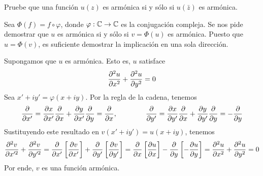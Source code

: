 \begin{exercise}
Pruebe que una función $u(z)$ es armónica si y sólo si $u(\bar z)$ es armónica.
\end{exercise}

\begin{solution}
Sea $\Phi(f) = f \circ \varphi$, donde $\varphi : \C \to \C$ es la conjugación compleja. Se nos pide demostrar que $u$ es armónica si y sólo si $v = \Phi(u)$ es armónica. Puesto que $u = \Phi(v)$, es suficiente demostrar la implicación en una sola dirección.

Supongamos que $u$ es armónica. Esto es, $u$ satisface
$$\s ux + \s uy = 0$$
Sea $x' + iy' = \varphi(x + iy)$. Por la regla de la cadena, tenemos
$$
\p {} {x'} = \p x {x'} \p {} x + \p y {x'} \p {} y = \p {} x, \qquad \qquad
\p {} {y'} = \p x {y'} \p {} x + \p y {y'} \p {} y = -\p {} y
$$
Sustituyendo este resultado en $v(x' + iy') = u(x + iy)$, tenemos
$$
\s v {x'} + \s v {y'}
    = \p {} {x'} \left[ \p v {x'} \right] + \p {} {y'} \left[ \p v {y'} \right]
    = \p {} x \left[ \p ux \right] - \p {} y \left[ -\p uy \right]
    = \s ux + \s uy
    = 0
$$
Por ende, $v$ es una función armónica.
\end{solution}
